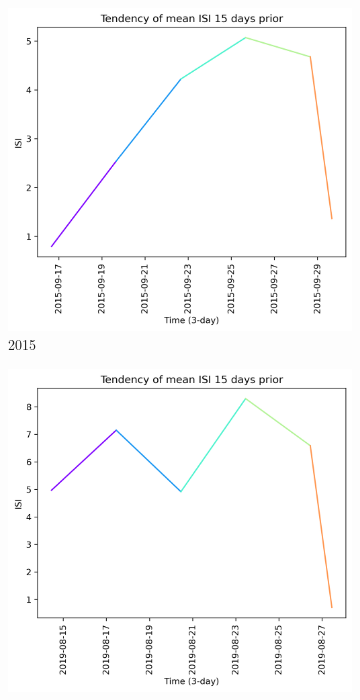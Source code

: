 \begin{figure}[h]
    \centering
    \caption{IS15daysI values 15 days prior to wildfire}
    \begin{subfigure}{0.3\textwidth}
        \centering
        \includegraphics[width=\textwidth]{graphs/15days/2015_15daysprior_tendency_graph_ISI.png}
        \caption{2015}
        \label{fig:isi_prior_15_days_2015}
    \end{subfigure}
    \hfill
    \begin{subfigure}{0.3\textwidth}
        \centering
        \includegraphics[width=\textwidth]{graphs/15days/2019_15daysprior_tendency_graph_ISI.png}

\end{subfigure}
\end{figure}
